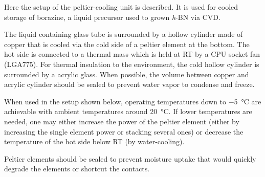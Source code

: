 Here the setup of the peltier-cooling unit is described. It is used for cooled  storage of borazine, a liquid precursor used to grown \textit{h}-BN via CVD.

The liquid containing glass tube is surrounded by a hollow cylinder made of copper that is cooled via the cold side of a peltier element at the bottom. The hot side is connected to a thermal mass which is held at RT by a CPU socket fan (LGA775). For thermal insulation to the environment, the cold hollow cylinder is surrounded by a acrylic glass. When possible, the volume between copper and acrylic cylinder should be sealed to prevent water vapor to condense and freeze. 

When used in the setup shown below, operating temperatures down to \SI{-5}{\celsius} are achievable with ambient temperatures around \SI{20}{\celsius}. If lower temperatures are needed, one may either increase the power of the peltier element (either by increasing the single element power or stacking several ones) or decrease the temperature of the hot side below RT (by water-cooling).

Peltier elements should be sealed to prevent moisture uptake that would quickly degrade the elements or shortcut the contacts.